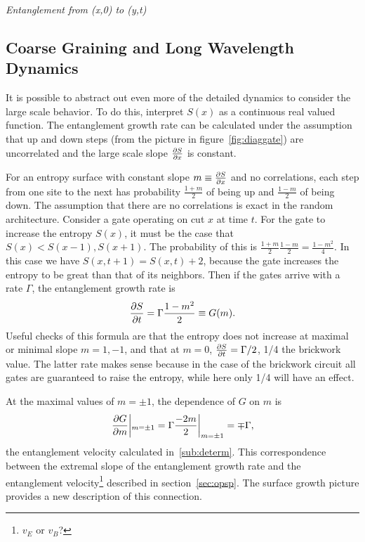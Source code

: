 \emph{Entanglement from (x,0) to (y,t)}

\subsection{Coarse Graining and Long Wavelength Dynamics} \label{sub:coarse}

It is possible to abstract out even more of the detailed dynamics to consider the large scale behavior. To do this, interpret $S(x)$ as a continuous real valued function. The entanglement growth rate can be calculated under the assumption that up and down steps (from the picture in figure~\ref{fig:diaggate}) are uncorrelated and the large scale slope $\frac{\partial S}{\partial x}$ is constant. 

For an entropy surface with constant slope $m\equiv\frac{\partial S}{\partial x}$ and no correlations, each step from one site to the next has probability $\frac{1+m}{2}$ of being up and $\frac{1-m}{2}$ of being down. The assumption that there are no correlations is exact in the random architecture. Consider a gate operating on cut $x$ at time $t$. For the gate to increase the entropy $S(x)$, it must be the case that $S(x)<S(x-1), S(x+1)$. The probability of this is $\frac{1+m}{2} \frac{1-m}{2} = \frac{1-m^2}{4}$. In this case we have $S(x,t+1)=S(x,t)+2$, because the gate increases the entropy to be great than that of its neighbors. Then if the gates arrive with a rate $\Gamma$, the entanglement growth rate is
\begin{align}
\frac{\partial S}{\partial t} = \Gamma\frac{1-m^2}{2}\equiv G(m).
\end{align}
Useful checks of this formula are that the entropy does not increase at maximal or minimal slope $m=1,-1$, and that at $m=0$, $\frac{\partial S}{\partial t}=\Gamma/2$, 1/4 the brickwork value. The latter rate makes sense because in the case of the brickwork circuit all gates are guaranteed to raise the entropy, while here only 1/4 will have an effect.

At the maximal values of $m=\pm1$, the dependence of $G$ on $m$ is 
\begin{align}
\left.\frac{\partial G}{\partial m}\middle|_{m=\pm 1}=\Gamma\frac{-2m}{2}\right|_{m=\pm 1} = \mp \Gamma,
\end{align}
the entanglement velocity calculated in~\ref{sub:determ}. This correspondence between the extremal slope of the entanglement growth rate and the entanglement velocity\footnote{$v_E$ or $v_B$?} described in section~\ref{sec:opsp}. The surface growth picture provides a new description of this connection.

